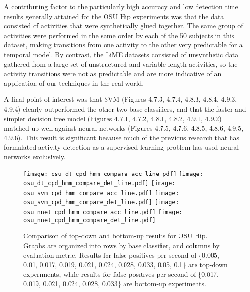 A contributing factor to the particularly high accuracy and low detection time
results generally attained for the OSU Hip experiments was that the data
consisted of activities that were synthetically glued together. The same group
of activities were performed in the same order by each of the 50 subjects in
this dataset, making transitions from one activity to the other very predictable
for a temporal model. By contrast, the LiME datasets consisted of unsynthetic
data gathered from a large set of unstructured and variable-length activities,
so the activity transitions were not as predictable and are more indicative of
an application of our techniques in the real world.

A final point of interest was that SVM (Figures 4.7.3, 4.7.4, 4.8.3, 4.8.4, 4.9.3, 4.9.4) clearly outperformed the other two
base classifiers, and that the faster and simpler decision tree model (Figures 4.7.1, 4.7.2, 4.8.1, 4.8.2, 4.9.1, 4.9.2) matched up
well against neural networks (Figures 4.7.5, 4.7.6, 4.8.5, 4.8.6, 4.9.5, 4.9.6). This result is significant because much of the
previous research that has formulated activity detection as a supervised learning
problem has used neural networks exclusively.

\begin{figure}[h]
 \centering
 \texttt{[image: osu\_dt\_cpd\_hmm\_compare\_acc\_line.pdf]} \hspace{1em}\vspace{1em}
 \texttt{[image: osu\_dt\_cpd\_hmm\_compare\_det\_line.pdf]} 
 \texttt{[image: osu\_svm\_cpd\_hmm\_compare\_acc\_line.pdf]} \hspace{1em}\vspace{1em}
 \texttt{[image: osu\_svm\_cpd\_hmm\_compare\_det\_line.pdf]}
 \texttt{[image: osu\_nnet\_cpd\_hmm\_compare\_acc\_line.pdf]} \hspace{1em}
 \texttt{[image: osu\_nnet\_cpd\_hmm\_compare\_det\_line.pdf]}
 \caption{Comparison of top-down and bottom-up results for OSU Hip.
  Graphs are organized into rows by base classifier, and columns by evaluation
  metric. Results for false positives per second of \{0.005, 0.01, 0.017, 0.019, 0.021, 0.024, 0.028, 0.033, 0.05, 0.1\} are 
  top-down experiments, while results for false positives per second of
  \{0.017, 0.019, 0.021, 0.024, 0.028, 0.033\} are bottom-up experiments.}
 \label{fig:osu_compare_cpd_hmm}
\end{figure}

